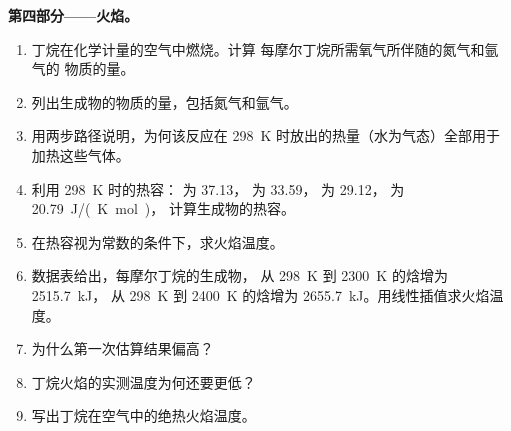 \begin{problem}
\medskip
\noindent\textbf{第四部分——火焰。}
\begin{enumerate}[resume]
  \item 丁烷在化学计量的空气中燃烧。计算
        每摩尔丁烷所需氧气所伴随的氮气和氩气的
        物质的量。
  \item 列出生成物的物质的量，包括氮气和氩气。
  \item 用两步路径说明，为何该反应在
        \qty{298}{K} 时放出的热量（水为气态）全部用于
        加热这些气体。
  \item 利用 \qty{298}{K} 时的热容： 为 37.13，
         为 33.59， 为 29.12， 为 \qty{20.79}{J/(K.mol)}，
        计算生成物的热容。
  \item 在热容视为常数的条件下，求火焰温度。
  \item 数据表给出，每摩尔丁烷的生成物，
        从 \qty{298}{K} 到 \qty{2300}{K} 的焓增为 \qty{2515.7}{kJ}，
        从 \qty{298}{K} 到
        \qty{2400}{K} 的焓增为 \qty{2655.7}{kJ}。用线性插值求火焰温度。
  \item 为什么第一次估算结果偏高？
  \item 丁烷火焰的实测温度为何还要更低？
  \item 写出丁烷在空气中的绝热火焰温度。
\end{enumerate}
\end{problem}
